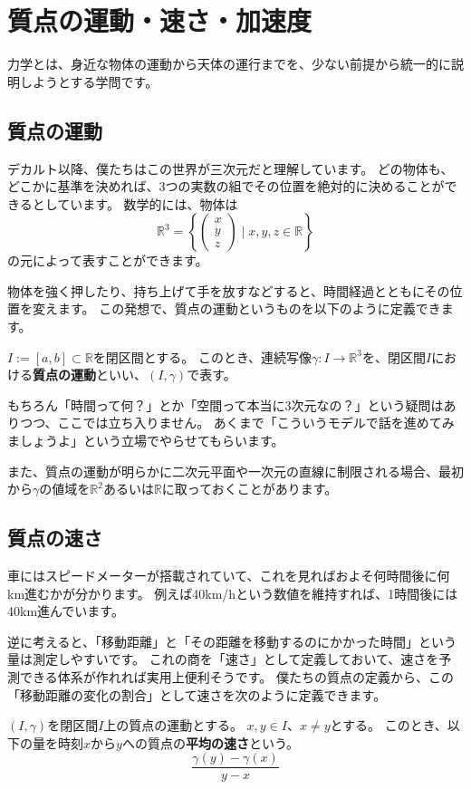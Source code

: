\chapter{質点の運動・速さ・加速度}

力学とは、身近な物体の運動から天体の運行までを、少ない前提から統一的に説明しようとする学問です。

\section{質点の運動}

デカルト以降、僕たちはこの世界が三次元だと理解しています。
どの物体も、どこかに基準を決めれば、3つの実数の組でその位置を絶対的に決めることができるとしています。
数学的には、物体は
\[
  \mathbb{R}^3=\left\{\begin{pmatrix}x\\y\\z\end{pmatrix}\mid x,y,z\in\mathbb{R}\right\}
\]
の元によって表すことができます。

物体を強く押したり、持ち上げて手を放すなどすると、時間経過とともにその位置を変えます。
この発想で、質点の運動というものを以下のように定義できます。
\begin{definition}
  $I:=[a,b]\subset\mathbb{R}$を閉区間とする。
  このとき、連続写像$\gamma:I\to\mathbb{R}^3$を、閉区間$I$における\textbf{質点の運動}といい、$(I,\gamma)$で表す。
\end{definition}

もちろん「時間って何？」とか「空間って本当に3次元なの？」という疑問はありつつ、ここでは立ち入りません。
あくまで「こういうモデルで話を進めてみましょうよ」という立場でやらせてもらいます。

また、質点の運動が明らかに二次元平面や一次元の直線に制限される場合、最初から$\gamma$の値域を$\mathbb{R}^2$あるいは$\mathbb{R}$に取っておくことがあります。



\section{質点の速さ}

車にはスピードメーターが搭載されていて、これを見ればおよそ何時間後に何km進むかが分かります。
例えば40km/hという数値を維持すれば、1時間後には40km進んでいます。

逆に考えると、「移動距離」と「その距離を移動するのにかかった時間」という量は測定しやすいです。
これの商を「速さ」として定義しておいて、速さを予測できる体系が作れれば実用上便利そうです。
僕たちの質点の定義から、この「移動距離の変化の割合」として速さを次のように定義できます。
\begin{definition}
  $(I,\gamma)$を閉区間$I$上の質点の運動とする。
  $x,y\in I$、$x\neq y$とする。
  このとき、以下の量を時刻$x$から$y$への質点の\textbf{平均の速さ}という。
  \[
    \frac{\gamma(y)-\gamma(x)}{y-x}
  \]
\end{definition}

